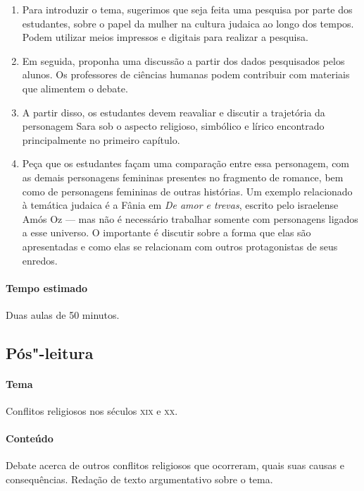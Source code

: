 \documentclass[12pt]{extarticle}
\begin{document}
\begin{enumerate}

\item Para introduzir o tema, sugerimos que seja feita uma 
pesquisa por parte dos estudantes, sobre o papel da mulher
na cultura judaica ao longo dos tempos. Podem utilizar 
meios impressos e digitais para realizar a pesquisa.

\item Em seguida, proponha uma discussão a partir dos dados
pesquisados pelos alunos. Os professores de ciências
humanas podem contribuir com materiais que alimentem o debate. 

\item A partir disso, os estudantes devem reavaliar e discutir a
trajetória da personagem Sara sob o
aspecto religioso, simbólico e lírico encontrado principalmente no
primeiro capítulo.

\item Peça que os estudantes façam uma comparação entre essa personagem, com as
demais personagens femininas presentes no fragmento de romance, bem como
de  personagens femininas de outras histórias. Um exemplo relacionado à temática judaica é 
a Fânia em \emph{De amor e trevas}, escrito pelo israelense Amós Oz --- mas não 
é necessário trabalhar somente com personagens ligados a esse universo. O importante é 
discutir sobre a forma que elas são apresentadas e como elas se relacionam com outros 
protagonistas de seus enredos.

\end{enumerate}

\paragraph{Tempo estimado} Duas aulas de 50 minutos.
   

\subsection{Pós"-leitura}

\paragraph{Tema} Conflitos religiosos nos séculos \textsc{xix} e \textsc{xx}.

\paragraph{Conteúdo} Debate acerca de outros conflitos religiosos
que ocorreram, quais suas causas e consequências. Redação de texto
argumentativo sobre o tema.
\end{document}
